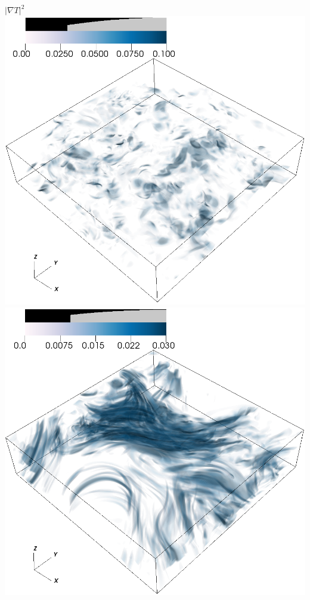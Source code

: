 \documentclass[30pt, blockverticalspace=1cm]{tikzposter}
\begin{document}
\begin{columns}
{\begin{center}
        \centering
        {\Large $|\nabla T|^2$}
    \emp
        \centering
        \includegraphics[width=.85\linewidth]{images/chi_Om0.5_vr2.png}
    \emp
        \centering
        \includegraphics[width=.85\linewidth]{images/chi_Om2_vr2.png}
    \emp
        \centering

\end{center}}
\end{columns}
\end{document}
